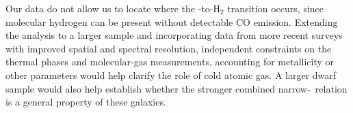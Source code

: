 Our data do not allow us to locate where the \HI-to-H$_2$ transition occurs, since molecular hydrogen can be present without detectable CO emission. Extending the analysis to a larger sample and incorporating data from more recent surveys with improved spatial and spectral resolution, independent constraints on the thermal phases and molecular-gas measurements, accounting for metallicity or other parameters would help clarify the role of cold atomic gas. A larger dwarf sample would also help establish whether the stronger combined narrow-\HI\ relation is a general property of these galaxies.